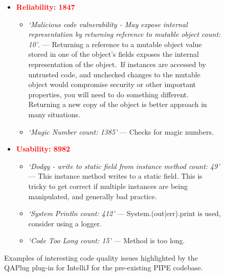 \begin{figure}[tbp]
\begin{framed}
\begin{itemize}
    \item \textcolor{red}{\textbf{Reliability: 1847}}
    \begin{itemize}
        \item \textit{`Malicious code vulnerability - May expose internal representation by returning reference to mutable object count: 10'}. --- Returning a reference to a mutable object value stored in one of the object's fields exposes the internal representation of the object. If instances are accessed by untrusted code, and unchecked changes to the mutable object would compromise security or other important properties, you will need to do something different. Returning a new copy of the object is better approach in many situations.
        \item \textit{`Magic Number count: 1385'} --- Checks for magic numbers.
    \end{itemize}

    \item \textcolor{red}{\textbf{Usability: 8982}}
    \begin{itemize}
        \item \textit{`Dodgy - write to static field from instance method count: 49'} --- This instance method writes to a static field. This is tricky to get correct if multiple instances are being manipulated, and generally bad practice. 
        \item \textit{`System Println count: 412'} --- System.(out|err).print is used, consider using a logger.
        \item \textit{`Code Too Long count: 15'} --- Method is too long.

    \end{itemize}
\end{itemize} 
\end{framed}
\caption{Examples of interesting code quality issues highlighted by the QAPlug plug-in for IntelliJ for the pre-existing PIPE codebase.}
\label{fig:qaplug}
\end{figure}
\normallinespacing